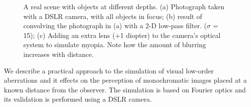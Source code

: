 \begin{figure}
	\caption[A real scene with objects at different depths]{A real scene with objects at different depths. (a) Photograph taken with a DSLR camera, with all objects in focus; (b) result of convolving the photograph in (a) with a 2-D low-pass filter. ($\sigma$ = 15); (c) Adding an extra lens (+1 diopter) to the camera's optical system to simulate myopia. Note how the amount of blurring increases with distance. }
	\label{fig:depthblur}
\end{figure}


%

We describe a practical approach to the simulation of visual low-order aberrations and it effects on the perception of monochromatic images placed at a known distance from the observer. The simulation is based on Fourier optics and its validation is performed using a DSLR camera.





% 

% 

% 